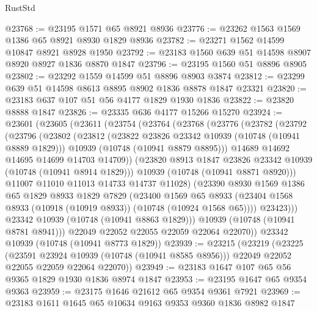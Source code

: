 \begin{lexlean}{RustStd}
\begin{coremodule}
{\begin{coremodule}
{{{{{@23768 := @23195 @1571 @65 @8921 @8936
@23776 := @23262 @1563 @1569 @1386 @65 @8921 @8930 @1829 @8936
@23782 := @23271 @1562 @14599 @10847 @8921 @8928 @1950
@23792 := @23183 @1560 @639 @51 @14598 @8907 @8920 @8927 @1836 @8870 @1847
@23796 := @23195 @1560 @51 @8896 @8905
@23802 := @23292 @1559 @14599 @51 @8896 @8903 @3874
@23812 := @23299 @639 @51 @14598 @8613 @8895 @8902 @1836 @8878 @1847 @23321
@23820 := @23183 @637 @107 @51 @56 @4177 @1829 @1930 @1836
@23822 := @23820 @8888 @1847
@23826 := @23335 @636 @4177 @15266 @15270
@23924 := @23601
    (@23605
      (@23611
        (@23754
          (@23764
            (@23768
              (@23776
                (@23782
                  (@23792
                    (@23796
                      (@23802
                        (@23812
                          (@23822 @23826 @23342 @10939 (@10748 (@10941 @8889 @1829)))
                          @10939
                          (@10748 (@10941 @8879 @8895)))
                        @14689
                        @14692
                        @14695
                        @14699
                        @14703
                        @14709))
                    (@23820 @8913 @1847 @23826 @23342 @10939 (@10748 (@10941 @8914 @1829)))
                    @10939
                    (@10748 (@10941 @8871 @8920)))
                  @11007
                  @11010
                  @11013
                  @14733
                  @14737
                  @11028)
                (@23390
                  @8930
                  @1569
                  @1386
                  @65
                  @1829
                  @8933
                  @1829
                  @7829
                  (@23400
                    @1569
                    @65
                    @8933
                    (@23404 @1568 @8933 (@10918 (@10919 @8933)) (@10748 (@10924 @1568 @65))))
                  @23423)))
            @23342
            @10939
            (@10748 (@10941 @8863 @1829)))
          @10939
          (@10748 (@10941 @8781 @8941)))
        @22049
        @22052
        @22055
        @22059
        @22064
        @22070))
    @23342
    @10939
    (@10748 (@10941 @8773 @1829))
@23939 := @23215
    (@23219
      (@23225
        (@23591 @23924 @10939 (@10748 (@10941 @8585 @8956)))
        @22049
        @22052
        @22055
        @22059
        @22064
        @22070))
@23949 := @23183 @1647 @107 @65 @56 @9365 @1829 @1930 @1836 @8974 @1847
@23953 := @23195 @1647 @65 @9354 @9363
@23959 := @23175 @1646 @21612 @65 @9354 @9361 @7921
@23969 := @23183 @1611 @1645 @65 @10634 @9163 @9353 @9360 @1836 @8982 @1847
}}}}}
\end{coremodule}}
\end{coremodule}
\end{lexlean}
